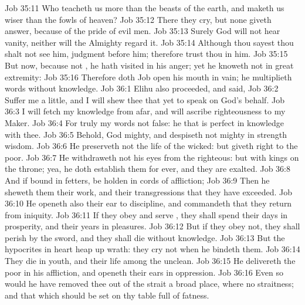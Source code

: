 \vs Job 35:11 Who teacheth us more than the beasts of the earth, and maketh us wiser than the fowls of heaven?
\vs Job 35:12 There they cry, but none giveth answer, because of the pride of evil men.
\vs Job 35:13 Surely God will not hear vanity, neither will the Almighty regard it.
\vs Job 35:14 Although thou sayest thou shalt not see him,  judgment  before him; therefore trust thou in him.
\vs Job 35:15 But now, because  not , he hath visited in his anger; yet he knoweth  not in great extremity:
\vs Job 35:16 Therefore doth Job open his mouth in vain; he multiplieth words without knowledge.
\vs Job 36:1 Elihu also proceeded, and said,
\vs Job 36:2 Suffer me a little, and I will shew thee that  yet to speak on God's behalf.
\vs Job 36:3 I will fetch my knowledge from afar, and will ascribe righteousness to my Maker.
\vs Job 36:4 For truly my words  not  false: he that is perfect in knowledge  with thee.
\vs Job 36:5 Behold, God  mighty, and despiseth not  mighty in strength  wisdom.
\vs Job 36:6 He preserveth not the life of the wicked: but giveth right to the poor.
\vs Job 36:7 He withdraweth not his eyes from the righteous: but with kings  on the throne; yea, he doth establish them for ever, and they are exalted.
\vs Job 36:8 And if  bound in fetters,  be holden in cords of affliction;
\vs Job 36:9 Then he sheweth them their work, and their transgressions that they have exceeded.
\vs Job 36:10 He openeth also their ear to discipline, and commandeth that they return from iniquity.
\vs Job 36:11 If they obey and serve , they shall spend their days in prosperity, and their years in pleasures.
\vs Job 36:12 But if they obey not, they shall perish by the sword, and they shall die without knowledge.
\vs Job 36:13 But the hypocrites in heart heap up wrath: they cry not when he bindeth them.
\vs Job 36:14 They die in youth, and their life  among the unclean.
\vs Job 36:15 He delivereth the poor in his affliction, and openeth their ears in oppression.
\vs Job 36:16 Even so would he have removed thee out of the strait  a broad place, where  no straitness; and that which should be set on thy table  full of fatness.
